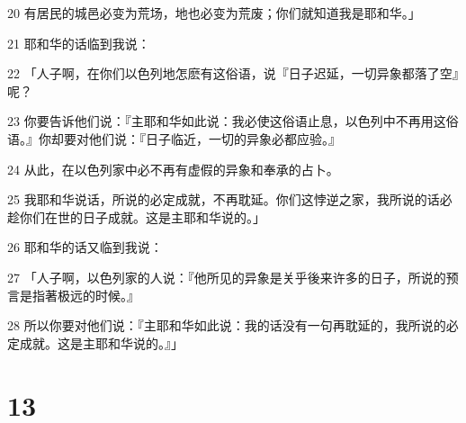 \par 20 有居民的城邑必变为荒场，地也必变为荒废；你们就知道我是耶和华。」
\par 21 耶和华的话临到我说：
\par 22 「人子啊，在你们以色列地怎麽有这俗语，说『日子迟延，一切异象都落了空』呢？
\par 23 你要告诉他们说：『主耶和华如此说：我必使这俗语止息，以色列中不再用这俗语。』你却要对他们说：『日子临近，一切的异象必都应验。』
\par 24 从此，在以色列家中必不再有虚假的异象和奉承的占卜。
\par 25 我耶和华说话，所说的必定成就，不再耽延。你们这悖逆之家，我所说的话必趁你们在世的日子成就。这是主耶和华说的。」
\par 26 耶和华的话又临到我说：
\par 27 「人子啊，以色列家的人说：『他所见的异象是关乎後来许多的日子，所说的预言是指著极远的时候。』
\par 28 所以你要对他们说：『主耶和华如此说：我的话没有一句再耽延的，我所说的必定成就。这是主耶和华说的。』」

\chapter{13}

